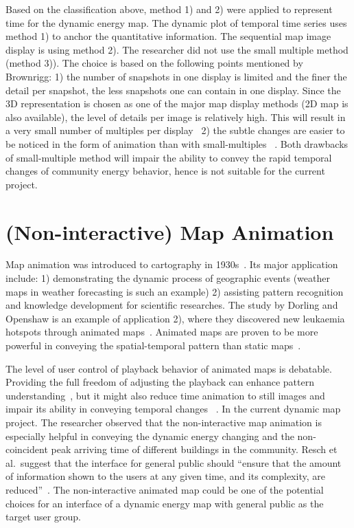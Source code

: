 Based on the classification above, method 1) and 2) were applied to
represent time for the dynamic energy map. The dynamic plot of
temporal time series uses method 1) to anchor the quantitative
information. The sequential map image display is using method 2). The
researcher did not use the small multiple method (method 3)). The
choice is based on the following points mentioned by Brownrigg: 1) the
number of snapshots in one display is limited and the finer the detail
per snapshot, the less snapshots one can contain in one display. Since
the 3D representation is chosen as one of the major map display
methods (2D map is also available), the level of details per image is
relatively high. This will result in a very small number of multiples
per display~\cite{Brownrigg2005} 2) the subtle changes are easier to
be noticed in the form of animation than with small-multiples
~\cite{Brownrigg2005}. Both drawbacks of small-multiple method will
impair the ability to convey the rapid temporal changes of community
energy behavior, hence is not suitable for the current project.

\section{(Non-interactive) Map Animation} \label{anime} 

Map animation was introduced to cartography in
1930s~\cite{Harrower2008}. Its major application include: 1)
demonstrating the dynamic process of geographic events (weather maps
in weather forecasting is such an example) 2) assisting pattern
recognition and knowledge development for scientific researches. The
study by Dorling and Openshaw is an example of application 2), where
they discovered new leukaemia hotspots through animated
maps~\cite{Dorling1992}.  Animated maps are proven to be more powerful
in conveying the spatial-temporal pattern than static
maps~\cite{McEachern1998}.

The level of user control of playback behavior of animated maps is
debatable. Providing the full freedom of adjusting the playback can
enhance pattern understanding~\cite{Nelson1998}, but it might also
reduce time animation to still images and impair its ability in
conveying temporal changes ~\cite{Lowe2004}. In the current dynamic
map project. The researcher observed that the non-interactive map
animation is especially helpful in conveying the dynamic energy
changing and the non-coincident peak arriving time of different
buildings in the community. Resch et al.\ suggest that the interface
for general public should ``ensure that the amount of information
shown to the users at any given time, and its complexity, are
reduced''~\cite{Resch2014}. The non-interactive animated map could be
one of the potential choices for an interface of a dynamic energy map
with general public as the target user group.

